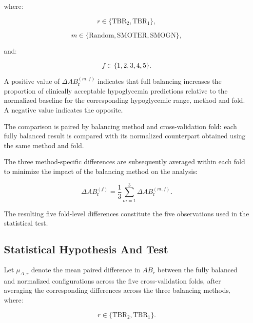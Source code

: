 where:

\begin{equation}
r \in \{\mathrm{TBR_2}, \mathrm{TBR_1}\},
\end{equation}

\begin{equation}
m
\in
\{
\mathrm{Random},
\mathrm{SMOTER},
\mathrm{SMOGN}
\},
\end{equation}

and:

\begin{equation}
f \in \{1,2,3,4,5\}.
\end{equation}

A positive value of \(\Delta AB_{\mathrm{r}}^{(m,f)}\) indicates that full balancing increases the proportion of clinically acceptable hypoglycemia predictions relative to the normalized baseline for the corresponding hypoglycemic range, method and fold. A negative value indicates the opposite.

The comparison is paired by balancing method and cross-validation fold: each fully balanced result is compared with its normalized counterpart obtained using the same method and fold.

The three method-specific differences are subsequently averaged within each fold to minimize the impact of the balancing method on the analysis:

\begin{equation}
\Delta AB_{\mathrm{r}}^{(f)}
=
\frac{1}{3}
\sum_{m=1}^{3}
\Delta AB_{\mathrm{r}}^{(m,f)}.
\label{eq:fold_mean_delta_ab_hypo}
\end{equation}

The resulting five fold-level differences constitute the five observations used in
the statistical test.

\subsection{Statistical Hypothesis And Test}
\label{subsec:statistical_hypotheses}

Let \(\mu_{\Delta,r}\) denote the mean paired difference in \(AB_r\) between the fully balanced and normalized configurations across the five cross-validation folds, after averaging the corresponding differences across the three balancing methods, where:

\begin{equation}
r \in \{\mathrm{TBR_2},\mathrm{TBR_1}\}.
\end{equation}

